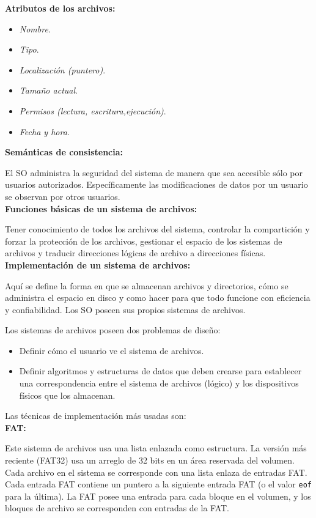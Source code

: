 \documentclass[a4paper,10pt,spanish]{article}
\begin{document}
\textbf{Atributos de los archivos:}

\begin{itemize}
\item \textit{Nombre}.
\item \textit{Tipo}.
\item \textit{Localización (puntero)}.
\item \textit{Tamaño actual}.
\item \textit{Permisos (lectura, escritura,ejecución)}.
\item \textit{Fecha y hora}.
\end{itemize}

\textbf{Semánticas de consistencia:}

El SO administra la seguridad del sistema de manera que sea accesible sólo por usuarios autorizados. Específicamente las modificaciones de datos por un usuario se observan por otros usuarios. \\

\textbf{Funciones básicas de un sistema de archivos:}

Tener conocimiento de todos los archivos del sistema, controlar la compartición y forzar la protección de los archivos, gestionar el espacio de los sistemas de archivos y traducir direcciones lógicas de archivo a direcciones físicas. \\

\textbf{Implementación de un sistema de archivos:}

Aquí se define la forma en que se almacenan archivos y directorios, cómo se administra el espacio en disco y como hacer para que todo funcione con eficiencia y confiabilidad. Los SO poseen sus propios sistemas de archivos.

Los sistemas de archivos poseen dos problemas de diseño:

\begin{itemize}
\item Definir cómo el usuario ve el sistema de archivos.
\item Definir algoritmos y estructuras de datos que deben crearse para establecer una correspondencia entre el sistema de archivos (lógico) y los dispositivos físicos que los almacenan.
\end{itemize}

Las técnicas de implementación más usadas son: \\

\textbf{FAT:}

Este sistema de archivos usa una lista enlazada como estructura. La versión más reciente (FAT32) usa un arreglo de 32 bits en un área reservada del volumen. Cada archivo en el sistema se corresponde con una lista enlaza de entradas FAT. Cada entrada FAT contiene un puntero a la siguiente entrada FAT (o el valor \texttt{eof} para la última). La FAT posee una entrada para cada bloque en el volumen, y los bloques de archivo se corresponden con entradas de la FAT. \\
\end{document}
